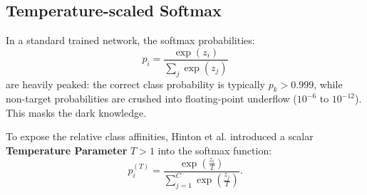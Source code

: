 \subsection{Temperature-scaled Softmax}
\label{sec:temperature_scaled_softmax}

In a standard trained network, the softmax probabilities:
\begin{equation}
p_i = \frac{\exp(z_i)}{\sum_j \exp(z_j)}
\end{equation}
are heavily peaked: the correct class probability is typically $p_k > 0.999$, while non-target probabilities are crushed into floating-point underflow ($10^{-6}$ to $10^{-12}$). This masks the dark knowledge.

To expose the relative class affinities, Hinton et al. introduced a scalar \textbf{Temperature Parameter} $T > 1$ into the softmax function:
\begin{equation}
p_i^{(T)} = \frac{\exp\left(\frac{z_i}{T}\right)}{\sum_{j=1}^C \exp\left(\frac{z_j}{T}\right)}.
\label{eq:temperature_softmax}
\end{equation}

